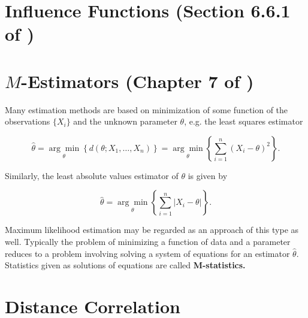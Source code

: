 \section{Influence Functions (Section 6.6.1 of \citet{serfling1980})}

\section{\(M\)-Estimators (Chapter 7 of \citet{serfling1980})}

Many estimation methods are based on minimization of some function of the observations \(\{X_i\}\) and the unknown parameter \(\theta\), e.g. the least squares estimator

\[
 \hat{\theta} = \underset{\theta}{\arg \min} \left\{ d(\theta; X_1, \ldots, X_n) \right\} = \underset{\theta}{\arg \min} \left\{  \sum_{i=1}^n (X_i - \theta)^2 \right\}.
\]

Similarly, the least absolute values estimator of \(\theta\) is given by

\[
 \hat{\theta} = \underset{\theta}{\arg \min} \left\{  \sum_{i=1}^n |X_i - \theta| \right\}.
\]

Maximum likelihood estimation may be regarded as an approach of this type as well. Typically the problem of minimizing a function of data and a parameter reduces to a problem involving solving a system of equations for an estimator \(\hat{\theta}\). Statistics given as solutions of equations are called \textbf{M-statistics.} 

\section{Distance Correlation}


%
%
%







